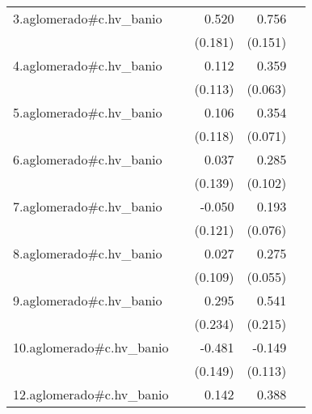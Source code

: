 {\begin{longtable}{l*{4}{D{.}{.}{-1}}}
\addlinespace
3.aglomerado#c.hv\_banio&                     &       0.520\sym{**} &       0.756\sym{***}&                     \\
            &                     &     (0.181)         &     (0.151)         &                     \\
\addlinespace
4.aglomerado#c.hv\_banio&                     &       0.112         &       0.359\sym{***}&                     \\
            &                     &     (0.113)         &     (0.063)         &                     \\
\addlinespace
5.aglomerado#c.hv\_banio&                     &       0.106         &       0.354\sym{***}&                     \\
            &                     &     (0.118)         &     (0.071)         &                     \\
\addlinespace
6.aglomerado#c.hv\_banio&                     &       0.037         &       0.285\sym{**} &                     \\
            &                     &     (0.139)         &     (0.102)         &                     \\
\addlinespace
7.aglomerado#c.hv\_banio&                     &      -0.050         &       0.193\sym{*}  &                     \\
            &                     &     (0.121)         &     (0.076)         &                     \\
\addlinespace
8.aglomerado#c.hv\_banio&                     &       0.027         &       0.275\sym{***}&                     \\
            &                     &     (0.109)         &     (0.055)         &                     \\
\addlinespace
9.aglomerado#c.hv\_banio&                     &       0.295         &       0.541\sym{*}  &                     \\
            &                     &     (0.234)         &     (0.215)         &                     \\
\addlinespace
10.aglomerado#c.hv\_banio&                     &      -0.481\sym{**} &      -0.149         &                     \\
            &                     &     (0.149)         &     (0.113)         &                     \\
\addlinespace
12.aglomerado#c.hv\_banio&                     &       0.142         &       0.388\sym{***}&                     \\

\end{longtable}}
